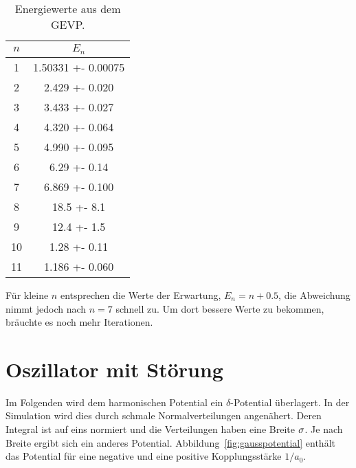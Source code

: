 \begin{table}
    \centering
    \begin{tabular}{SS}
        {$n$} & {$E_n$} \\
         & 1.50331 +- 0.00075 \\
         2 &   2.429 +- 0.020   \\
         3 &   3.433 +- 0.027   \\
         4 &   4.320 +- 0.064   \\
         5 &   4.990 +- 0.095   \\
         6 &    6.29 +- 0.14    \\
         7 &   6.869 +- 0.100   \\
         8 &    18.5 +- 8.1     \\
         9 &    12.4 +- 1.5     \\
        10 &    1.28 +- 0.11    \\
        11 &   1.186 +- 0.060  
    \end{tabular}
    \caption{%
        Energiewerte aus dem GEVP.
    }
    \label{tab:ED7AA2-eigenwerte}
\end{table}

Für kleine $n$ entsprechen die Werte der Erwartung, $E_n = n + \num{0.5}$, die
Abweichung nimmt jedoch nach $n = 7$ schnell zu. Um dort bessere Werte zu
bekommen, bräuchte es noch mehr Iterationen.

\FloatBarrier
\section{Oszillator mit Störung}

Im Folgenden wird dem harmonischen Potential ein $\delta$-Potential überlagert.
In der Simulation wird dies durch schmale Normalverteilungen angenähert. Deren
Integral ist auf eins normiert und die Verteilungen haben eine Breite
$\sigma$. Je nach Breite ergibt sich ein anderes Potential.
Abbildung~\ref{fig:gausspotential} enthält das Potential für eine negative und
eine positive Kopplungsstärke $1/a_0$.

